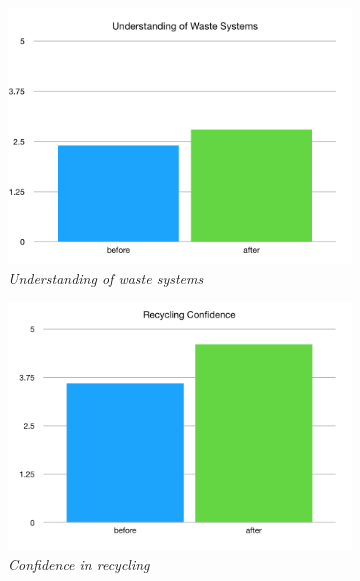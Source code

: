 \documentclass[nofonts,nols,justified,nobib]{tufte-book}
\begin{document}
\begin{figure}
\caption{Graphs comparing the results of surveys taken before and after playing the card game)}\label{graphs}
\begin{subfigure}{.45\textwidth}
  \centering
  \includegraphics[width=1\linewidth]{img/4/llk-waste-understanding.png}
\caption{\textit{Understanding of waste systems}}
\end{subfigure}
 \quad
\begin{subfigure}{.45\textwidth}
  \centering
  \includegraphics[width=1\linewidth]{img/4/llk-recycling-confidence.png}
\caption{\textit{Confidence in recycling}}
\end{subfigure}%
\vspace{0.8cm}
  \centering
\begin{subfigure}{.45\textwidth}

\end{subfigure}
\end{figure}
\end{document}
